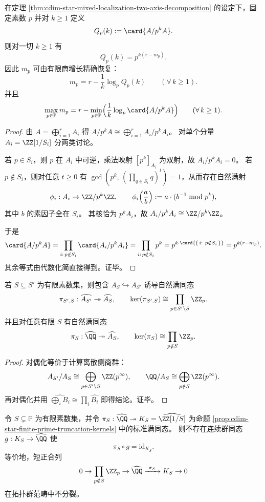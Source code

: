 \begin{theorem}[素幂粗分辨率的有限商增长谱与素数多重度反演]\label{thm:cdim-star-mixed-localization-pk-growth-inversion}
在定理 \ref{thm:cdim-star-mixed-localization-two-axis-decomposition} 的设定下，固定素数 \(p\) 并对 \(k\ge 1\) 定义
\[
Q_p(k):=\card{A/p^{k}A}.
\]
则对一切 \(k\ge 1\) 有
\[
Q_p(k)=p^{k(r-m_p)}.
\]
因此 \(m_p\) 可由有限商增长精确恢复：
\[
m_p=r-\frac{1}{k}\log_{p}Q_p(k)\qquad(\forall\,k\ge 1).
\]
并且
\[
\max_{p\in\mathbb P}m_p
=
r-\min_{p\in\mathbb P}\Bigl(\frac{1}{k}\log_p\card{A/p^kA}\Bigr)\qquad(\forall\,k\ge 1).
\]
\end{theorem}
\begin{proof}
由 \(A=\bigoplus_{i=1}^{r}A_i\) 得 \(A/p^{k}A\cong\bigoplus_{i=1}^{r}A_i/p^{k}A_i\)。
对单个分量 \(A_i=\ZZ[1/S_i]\) 分两类讨论。
\par
若 \(p\in S_i\)，则 \(p\) 在 \(A_i\) 中可逆，乘法映射 \([p^k]_{A_i}\) 为双射，故 \(A_i/p^{k}A_i=0\)。
若 \(p\notin S_i\)，则对任意 \(t\ge 0\) 有 \(\gcd(p^k,\,(\prod_{q\in S_i}q)^t)=1\)，从而存在自然满射
\[
\phi_i:A_i\to \ZZ/p^{k}\ZZ,
\qquad
\phi_i\!\left(\frac{a}{b}\right):=a\cdot(b^{-1}\bmod p^{k}),
\]
其中 \(b\) 的素因子全在 \(S_i\)。
其核恰为 \(p^{k}A_i\)，故 \(A_i/p^{k}A_i\cong \ZZ/p^{k}\ZZ\)。
\par
于是
\[
\card{A/p^{k}A}
=\prod_{i:\,p\notin S_i}\card{A_i/p^{k}A_i}
=\prod_{i:\,p\notin S_i}p^{k}
=p^{k\cdot \card{\{\,i:\ p\notin S_i\,\}}}
=p^{k(r-m_p)}.
\]
其余等式由代数化简直接得到。证毕。
\end{proof}

\begin{proposition}[有限素数截断映射的核]\label{prop:cdim-star-finite-prime-truncation-kernels}
若 \(S\subseteq S'\) 为有限素数集，则包含 \(A_S\hookrightarrow A_{S'}\) 诱导自然满同态
\[
\pi_{S',S}:\widehat{A_{S'}}\twoheadrightarrow \widehat{A_S},
\qquad
\ker(\pi_{S',S})\cong \prod_{p\in S'\setminus S}\ZZ_p.
\]
并且对任意有限 \(S\) 有自然满同态
\[
\pi_S:\widehat{\QQ}\twoheadrightarrow \widehat{A_S},
\qquad
\ker(\pi_S)\cong \prod_{p\notin S}\ZZ_p.
\]
\end{proposition}
\begin{proof}
对偶化等价于计算离散侧商群：
\[
A_{S'}/A_S\cong \bigoplus_{p\in S'\setminus S}\ZZ(p^\infty),\qquad
\QQ/A_S\cong \bigoplus_{p\notin S}\ZZ(p^\infty).
\]
再对偶化并用
\(
\widehat{\bigoplus_i B_i}\cong \prod_i \widehat{B_i}
\)
即得结论。证毕。
\end{proof}

\begin{corollary}[有限素数截断不存在连续分裂截面]\label{cor:cdim-star-no-continuous-section-finite-truncation}
令 \(S\subsetneq\mathbb P\) 为有限素数集，并令
\(
\pi_S:\widehat{\QQ}\twoheadrightarrow K_S=\widehat{\ZZ[1/S]}
\)
为命题 \ref{prop:cdim-star-finite-prime-truncation-kernels} 中的标准满同态。
则不存在连续群同态 \(g:K_S\to \widehat{\QQ}\) 使
\[
\pi_S\circ g=\mathrm{id}_{K_S}.
\]
等价地，短正合列
\[
0\to \prod_{p\notin S}\ZZ_p\to \widehat{\QQ}\xrightarrow{\ \pi_S\ }K_S\to 0
\]
在拓扑群范畴中不分裂。
\end{corollary}

